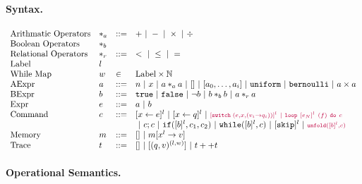 \documentclass[a4paper,11pt]{article}
\begin{document}
\paragraph{Syntax.}
\[
\begin{array}{llll}
 \mbox{Arithmatic Operators} & *_a & ::= & + ~|~ - ~|~ \times 
%
~|~ \div \\  
  \mbox{Boolean Operators} & *_b & & \\
   \mbox{Relational Operators} & *_r & ::= & < ~|~ \leq ~|~ = \\  
 \mbox{Label} & l & & \\ 
 \mbox{While Map} & w & \in & \mbox{Label} \times \mathbb{N} \\
\mbox{AExpr} & \aexpr & ::= & 
	n ~|~ x ~|~ \aexpr *_a \aexpr ~|~ {[] ~|~ [\aexpr_0, \dots, \aexpr_i] ~|~ \uniform ~|~ \bernoulli ~|~ \aexpr \times \aexpr } \\
\mbox{BExpr} & \bexpr & ::= & 
	\etrue ~|~ \efalse  ~|~ \neg \bexpr
	 ~|~ \bexpr *_b \bexpr
	~|~ \aexpr *_r \aexpr \\
\mbox{Expr} & \expr & ::= & \aexpr \sep \bexpr \\	
\mbox{Command} & c & ::= &   [\assign x \expr]^{l} ~|~  [\assign x q]^{l}
%
~|~ \jl{[\eswitch( \expr, x, (v_i \to  q_i))]^{l} \sep \eloop ~ [\expr_N]^{l} ~ (f) ~ \edo ~ c }  \\ 
& & & ~|~  c ; c ~|~ \eif([\bexpr]^{l}, c_1, c_2) 
	~|~ \ewhile([\bexpr]^{l}, c) ~|~ [\eskip]^{l} ~|~ \jl{\eunfold{[\bexpr]^{l}}{c} } 
	\\
\mbox{Memory} & m & ::= & [] ~|~ m[x^{l} \to v] \\
%
\mbox{Trace} & t & ::= & [] ~|~ [(q, v)^{(l, w) }] ~|~ t ++ t
\end{array}
\]
%
\paragraph{Operational Semantics.}
\end{document}
